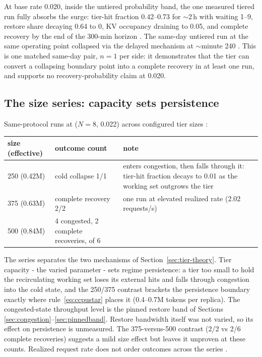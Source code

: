 At base rate 0.020, inside the untiered probability band, the one
measured tiered run fully absorbs the surge: tier-hit fraction
0.42--0.73 for $\sim$2\,h with waiting 1--9, restore share decaying 0.64 to
0, KV occupancy draining to 0.05, and complete recovery by the end
of the 300-min horizon . The same-day untiered run at the same
operating point collapsed via the delayed mechanism at $\sim$minute 240
. This is one matched same-day pair, $n=1$ per side: it
demonstrates that the tier can convert a collapsing boundary point
into a complete recovery in at least one run, and supports no
recovery-probability claim at 0.020.

\subsection{The size series: capacity sets persistence}
\label{sec:sizeseries}

Same-protocol runs at ($N{=}8$, 0.022) across configured tier sizes
:

\begin{center}
\small
\begin{tabular}{@{}p{}p{}p{}@{}}
\toprule
size (effective) & outcome count & note \\
\midrule
250 (0.42M) & cold collapse 1/1 & enters congestion, then falls through it: tier-hit fraction decays to 0.01 as the working set outgrows the tier \\
375 (0.63M) & complete recovery 2/2 & one run at elevated realized rate (2.02 requests/s) \\
500 (0.84M) & 4 congested, 2 complete recoveries, of 6 & \\
\bottomrule
\end{tabular}
\end{center}

The series separates the two mechanisms of Section~\ref{sec:tier-theory}. Tier
capacity - the varied parameter - sets regime persistence: a tier
too small to hold the recirculating working set loses its external
hits and falls through congestion into the cold state, and the
250/375 contrast brackets the persistence boundary exactly where
rule~\eqref{eq:ccpustar} places it (0.4--0.7M tokens per replica). The
congested-state throughput level is the pinned restore band of
Sections \ref{sec:congestion}--\ref{sec:pinnedband}. Restore bandwidth itself was not varied, so its
effect on persistence is unmeasured. The 375-versus-500 contrast
(2/2 vs 2/6 complete recoveries) suggests a mild size effect but
leaves it unproven at these counts. Realized request rate does not
order outcomes across the series .

